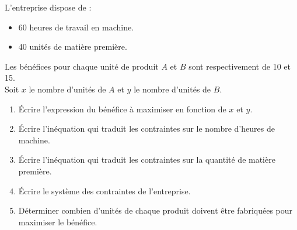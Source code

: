\documentclass[12pt,a4paper]{article}
\begin{document}
L’entreprise dispose de :
\begin{itemize}
    \item 60 heures de travail en machine.
    \item 40 unités de matière première.
\end{itemize}

Les bénéfices pour chaque unité de produit $A$ et $B$ sont respectivement de 10 et 15.\\
Soit $x$ le nombre d’unités de $A$ et $y$ le nombre d’unités de $B$.

\begin{enumerate}
    \item Écrire l’expression du bénéfice à maximiser en fonction de $x$ et $y$.
    \item Écrire l’inéquation qui traduit les contraintes sur le nombre d’heures de machine.
    \item Écrire l’inéquation qui traduit les contraintes sur la quantité de matière première.
    \item Écrire le système des contraintes de l’entreprise.
    \item Déterminer combien d’unités de chaque produit doivent être fabriquées pour maximiser le bénéfice.
\end{enumerate}
\end{document}
